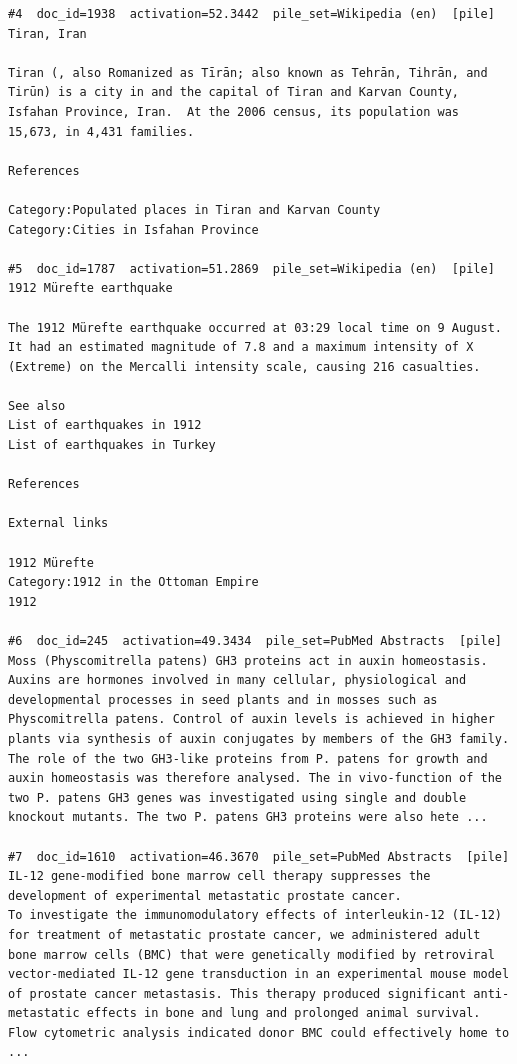 \begin{verbatim}
#4  doc_id=1938  activation=52.3442  pile_set=Wikipedia (en)  [pile]
Tiran, Iran

Tiran (, also Romanized as Tīrān; also known as Tehrān, Tihrān, and Tirūn) is a city in and the capital of Tiran and Karvan County, Isfahan Province, Iran.  At the 2006 census, its population was 15,673, in 4,431 families.

References

Category:Populated places in Tiran and Karvan County
Category:Cities in Isfahan Province

#5  doc_id=1787  activation=51.2869  pile_set=Wikipedia (en)  [pile]
1912 Mürefte earthquake

The 1912 Mürefte earthquake occurred at 03:29 local time on 9 August. It had an estimated magnitude of 7.8 and a maximum intensity of X (Extreme) on the Mercalli intensity scale, causing 216 casualties.

See also
List of earthquakes in 1912
List of earthquakes in Turkey

References

External links

1912 Mürefte
Category:1912 in the Ottoman Empire
1912

#6  doc_id=245  activation=49.3434  pile_set=PubMed Abstracts  [pile]
Moss (Physcomitrella patens) GH3 proteins act in auxin homeostasis.
Auxins are hormones involved in many cellular, physiological and developmental processes in seed plants and in mosses such as Physcomitrella patens. Control of auxin levels is achieved in higher plants via synthesis of auxin conjugates by members of the GH3 family. The role of the two GH3-like proteins from P. patens for growth and auxin homeostasis was therefore analysed. The in vivo-function of the two P. patens GH3 genes was investigated using single and double knockout mutants. The two P. patens GH3 proteins were also hete ...

#7  doc_id=1610  activation=46.3670  pile_set=PubMed Abstracts  [pile]
IL-12 gene-modified bone marrow cell therapy suppresses the development of experimental metastatic prostate cancer.
To investigate the immunomodulatory effects of interleukin-12 (IL-12) for treatment of metastatic prostate cancer, we administered adult bone marrow cells (BMC) that were genetically modified by retroviral vector-mediated IL-12 gene transduction in an experimental mouse model of prostate cancer metastasis. This therapy produced significant anti-metastatic effects in bone and lung and prolonged animal survival. Flow cytometric analysis indicated donor BMC could effectively home to ...


\end{verbatim}
